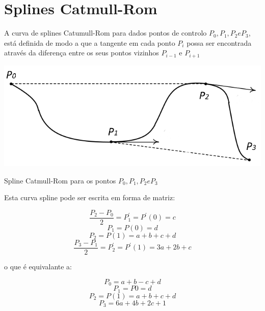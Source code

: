 \section{Splines Catmull-Rom}

A curva de splines Catumull-Rom para dados pontos de controlo $P_{0}, P_{1}, P_{2} e P_{3}$, está definida de modo a que a tangente em cada ponto $P_{i}$ possa ser encontrada através da diferença entre os seus pontos vizinhos $P_{i-1}$ e $P_{i+1}$

\begin{center}
 	
 	\includegraphics[scale=0.5,keepaspectratio]{resources/catmullDeriv.png}
 	\captionsetup{type=figure, width=0.8\linewidth}
	\caption{Spline Catmull-Rom para os pontos $P_{0}, P_{1}, P_{2} e P_{3}$}
\label{fig:ssec1:diagram:plane:to:sphere} 
\end{center}

Esta curva spline pode ser escrita em forma de matriz:

\begin{equation}
\frac{P_{2}-P_{0}}{2} = P_{1}^{'} = P^{'}(0) = c  \nonumber
\end{equation}
\begin{equation}
P_{1} = P(0) = d 		\nonumber
\end{equation}
\begin{equation}
P_{2}=P(1)=a+b+c+d 		\nonumber
\end{equation}
\begin{equation}
\frac{P_{3}-P_{1}}{2} = P_{2}^{'} = P^{'}(1) = 3a+2b+c 
\end{equation}


o que é equivalante a:

\begin{equation}
P_{0} = a+b-c+d 		\nonumber
\end{equation}
\begin{equation}
P_{1} = P{0} = d 		\nonumber
\end{equation}
\begin{equation}
P_{2}=P(1)=a+b+c+d 		\nonumber
\end{equation}
\begin{equation}
P_{3}=6a+4b+2c+1
\end{equation}

